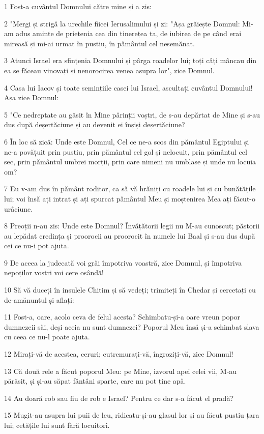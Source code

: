 \par 1 Fost-a cuvântul Domnului către mine și a zis:
\par 2 "Mergi și strigă la urechile fiicei Ierusalimului și zi: "Așa grăiește Domnul: Mi-am adus aminte de prietenia cea din tinerețea ta, de iubirea de pe când erai mireasă și mi-ai urmat în pustiu, în pământul cel nesemănat.
\par 3 Atunci Israel era sfințenia Domnului și pârga roadelor lui; toți câți mâncau din ea se făceau vinovați și nenorocirea venea asupra lor", zice Domnul.
\par 4 Casa lui Iacov și toate semințiile casei lui Israel, ascultați cuvântul Domnului! Așa zice Domnul:
\par 5 "Ce nedreptate au găsit în Mine părinții voștri, de s-au depărtat de Mine și s-au dus după deșertăciune și au devenit ei înșiși deșertăciune?
\par 6 În loc să zică: Unde este Domnul, Cel ce ne-a scos din pământul Egiptului și ne-a povățuit prin pustiu, prin pământul cel gol și nelocuit, prin pământul cel sec, prin pământul umbrei morții, prin care nimeni nu umblase și unde nu locuia om?
\par 7 Eu v-am dus în pământ roditor, ca să vă hrăniți cu roadele lui și cu bunătățile lui; voi însă ați intrat și ați spurcat pământul Meu și moștenirea Mea ați făcut-o urâciune.
\par 8 Preoții n-au zis: Unde este Domnul? Învățătorii legii nu M-au cunoscut; păstorii au lepădat credința și proorocii au proorocit în numele lui Baal și s-au dus după cei ce nu-i pot ajuta.
\par 9 De aceea la judecată voi grăi împotriva voastră, zice Domnul, și împotriva nepoților voștri voi cere osândă!
\par 10 Să vă duceți în insulele Chitim și să vedeți; trimiteți în Chedar și cercetați cu de-amănuntul și aflați:
\par 11 Fost-a, oare, acolo ceva de felul acesta? Schimbatu-și-a oare vreun popor dumnezeii săi, deși aceia nu sunt dumnezei? Poporul Meu însă și-a schimbat slava cu ceea ce nu-l poate ajuta.
\par 12 Mirați-vă de acestea, ceruri; cutremurați-vă, îngroziți-vă, zice Domnul!
\par 13 Că două rele a făcut poporul Meu: pe Mine, izvorul apei celei vii, M-au părăsit, și și-au săpat fântâni sparte, care nu pot ține apă.
\par 14 Au doară rob sau fiu de rob e Israel? Pentru ce dar s-a făcut el pradă?
\par 15 Mugit-au asupra lui puii de leu, ridicatu-și-au glasul lor și au făcut pustiu țara lui; cetățile lui sunt fără locuitori.
